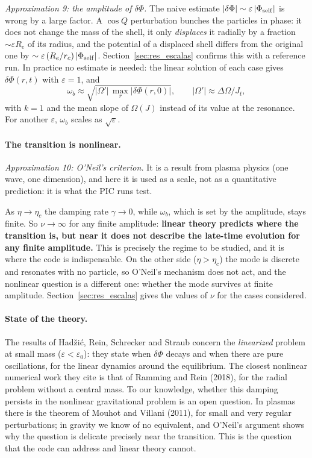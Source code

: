 \documentclass[11pt,a4paper]{article}
\begin{document}
\emph{Approximation 9: the amplitude of $\delta\Phi$.} The naive estimate
$|\delta\Phi|\sim\varepsilon\,|\Phi_{\rm self}|$ is wrong by a large factor. A $\cos Q$ perturbation bunches
the particles in phase: it does not change the mass of the shell, it only
\emph{displaces} it radially by a fraction $\sim\varepsilon R_e$ of its radius, and the potential
of a displaced shell differs from the original one by $\sim\varepsilon\,(R_e/r_c)\,|\Phi_{\rm self}|$.
Section~\ref{sec:res_escalas} confirms this with a reference run. In practice no estimate
is needed: the linear solution of each case gives $\delta\Phi(r,t)$ with $\varepsilon=1$, and
\[
  \omega_b \approx \sqrt{|\Omega'|\,\max_r|\delta\Phi(r,0)|},\qquad |\Omega'|\approx\Delta\Omega/J_t ,
\]
with $k=1$ and the mean slope of $\Omega(J)$ instead of its value at the resonance. For
another $\varepsilon$, $\omega_b$ scales as $\sqrt\varepsilon$.

\paragraph{The transition is nonlinear.} \emph{Approximation 10: O'Neil's criterion.} It is
a result from plasma physics (one wave, one dimension), and here it is used as a scale,
not as a quantitative prediction: it is what the PIC runs test.

As $\eta\to\eta_c$ the damping rate $\gamma\to0$, while $\omega_b$, which is set by the amplitude, stays
finite. So $\nu\to\infty$ for any finite amplitude: \textbf{linear theory predicts where the
transition is, but near it does not describe the late-time evolution for any finite
amplitude.} This is precisely the regime to be studied, and it is where the code is
indispensable. On the other side ($\eta>\eta_c$) the mode is discrete and resonates with no
particle, so O'Neil's mechanism does not act, and the nonlinear question is a different
one: whether the mode survives at finite amplitude. Section~\ref{sec:res_escalas} gives the
values of $\nu$ for the cases considered.

\paragraph{State of the theory.} The results of Hadžić, Rein, Schrecker and Straub
concern the \emph{linearized} problem at small mass ($\varepsilon<\varepsilon_0$): they state when
$\delta\Phi$ decays and when there are pure oscillations, for the linear dynamics around the
equilibrium. The closest nonlinear numerical work they cite is that of Ramming and
Rein (2018), for the radial problem without a central mass. To our knowledge, whether
this damping persists in the nonlinear gravitational problem is an open question. In
plasmas there is the theorem of Mouhot and Villani (2011), for small and very regular
perturbations; in gravity we know of no equivalent, and O'Neil's argument shows why the
question is delicate precisely near the transition. This is the question that the code
can address and linear theory cannot.
\end{document}
